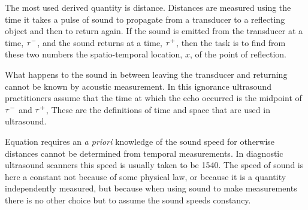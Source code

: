 The most used derived quantity is distance.
Distances are measured using the time it takes a pulse of sound to propagate from a transducer
to a reflecting object and then to return again. 
If the sound is emitted from the transducer at a time, $\tau^-$,
and the sound returns at a time,  $\tau^+$,
then the task is to find from these two numbers the spatio-temporal location, $x$,
of the point of reflection.

What happens to the sound in between leaving the transducer and returning
cannot be known by acoustic measurement.
In this ignorance ultrasound practitioners assume that the time at which the echo 
occurred is the midpoint of $\tau^-$ and $\tau^+$,
These are the definitions of time and space that are used in ultrasound.



Equation  requires an {\em a priori} knowledge of the sound speed
for otherwise distances cannot be determined from temporal measurements.
In diagnostic ultrasound scanners this speed is usually taken to be \unit{1540}\metre\reciprocal\second.
The speed of sound is here a constant not because of some physical law, 
or because it is a quantity independently measured,
but because when using sound to make measurements 
there is no other choice  but to assume the sound speeds constancy. %

